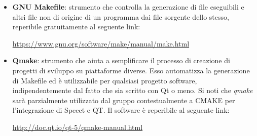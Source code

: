 \documentclass[./../Technology Baseline.tex]{subfiles}
\begin{document}
\begin{itemize}
	\item \textbf{GNU Makefile}: strumento che controlla la generazione di file eseguibili e altri file non di origine di un programma dai file sorgente dello stesso, reperibile gratuitamente al seguente link:
	\begin{center}
		\url{https://www.gnu.org/software/make/manual/make.html}
	\end{center}

	\item \textbf{Qmake}: strumento che aiuta a semplificare il processo di creazione di progetti di sviluppo su piattaforme diverse. Esso automatizza la generazione di Makefile ed è utilizzabile per qualsiasi progetto software, indipendentemente dal fatto che sia scritto con Qt o meno. Si noti che \textit{qmake} sarà parzialmente utilizzato dal gruppo contestualmente a CMAKE per l'integrazione di Speect e QT. Il software è reperibile al seguente link:
	\begin{center}
		\url{http://doc.qt.io/qt-5/qmake-manual.html}
	\end{center} 
\end{itemize}
\end{document}
